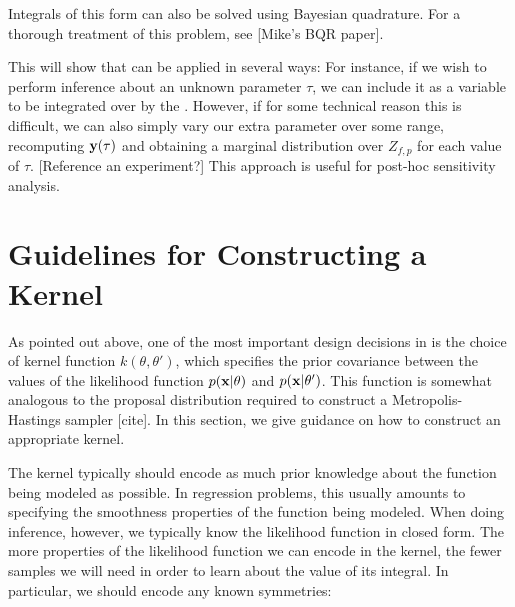 %
%
%
%
%
Integrals of this form can also be solved using Bayesian quadrature.  For a thorough treatment of this problem, see [Mike's BQR paper].  

This will show that \bq{} can be applied in several ways:  For instance, if we wish to perform inference about an unknown parameter $\tau$, we can include it as a variable to be integrated over by the \gp{}.  However, if for some technical reason this is difficult, we can also simply vary our extra parameter over some range, recomputing ${\bf{y}}(\tau)$ and obtaining a marginal distribution over $Z_{f,p}$ for each value of $\tau$.  [Reference an experiment?]  This approach is useful for post-hoc sensitivity analysis.


\section{Guidelines for Constructing a Kernel}
\label{sec:kernels}

As pointed out above, one of the most important design decisions in \bq{} is the choice of kernel function $k(\theta, \theta')$, which specifies the prior covariance between the values of the likelihood function $p({\bf{x}} | \theta)$ and $p({\bf{x}} | \theta')$.  This function is somewhat analogous to the proposal distribution required to construct a Metropolis-Hastings sampler [cite].  In this section, we give guidance on how to construct an appropriate kernel.

The kernel typically should encode as much prior knowledge about the function being modeled as possible.  In regression problems, this usually amounts to specifying the smoothness properties of the function being modeled.  When doing inference, however, we typically know the likelihood function in closed form.  The more properties of the likelihood function we can encode in the kernel, the fewer samples we will need in order to  learn about the value of its integral.  In particular, we should encode any known symmetries:

